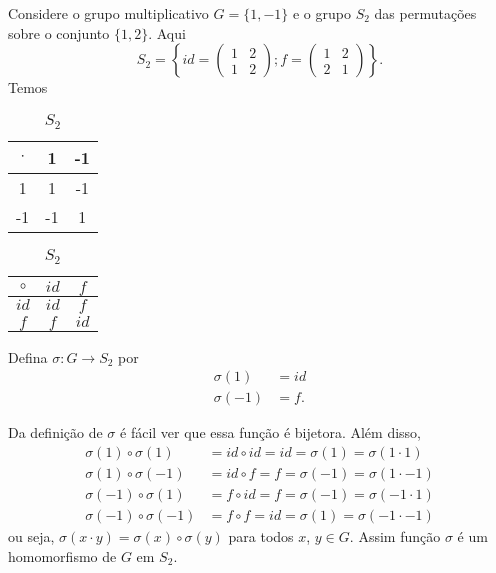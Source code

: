 Considere o grupo multiplicativo $G = \{1, -1\}$ e o grupo $S_2$ das permuta\c{c}\~oes sobre o conjunto $\{1,2\}$. Aqui
\[
    S_2 = \left\{id = \begin{pmatrix}
        1 & 2\\1 & 2
    \end{pmatrix}; f = \begin{pmatrix}
        1 & 2\\2 & 1
    \end{pmatrix}\right\}.
\]
Temos
\begin{table}[!htp]
    \begin{minipage}{.5\linewidth}
        \caption{$G$}
        \centering
        \begin{tabular}{|c|c|c|}
            \hline
            $\cdot$ & 1 & -1\\
            \hline
            1 & 1 & -1\\
            \hline
            -1 & -1 & 1\\
            \hline
        \end{tabular}
    \end{minipage}%
    \begin{minipage}{.5\linewidth}
        \caption{$S_2$}
        \centering
        \begin{tabular}{|c|c|c|}
            \hline
            $\circ$ & $id$ & $f$\\
            \hline
            $id$ & $id$ & $f$\\
            \hline
            $f$ & $f$ & $id$\\
            \hline
        \end{tabular}
    \end{minipage}
\end{table}

Defina $\sigma : G \to S_2$ por
\begin{align*}
    \sigma(1) &= id\\
    \sigma(-1) &= f.
\end{align*}

Da defini\c{c}\~ao de $\sigma$ \'e f\'acil ver que essa fun\c{c}\~ao \'e bijetora. Al\'em disso,
\begin{align*}
    \sigma(1) \circ \sigma(1) &= id \circ id = id = \sigma(1) = \sigma(1 \cdot 1)\\
    \sigma(1) \circ \sigma(-1) &= id \circ f = f = \sigma(-1) = \sigma(1 \cdot -1)\\
    \sigma(-1) \circ \sigma(1) &= f \circ id = f = \sigma(-1) = \sigma(-1 \cdot 1)\\
    \sigma(-1) \circ \sigma(-1) &= f \circ f = id = \sigma(1) = \sigma(-1 \cdot -1)
\end{align*}
ou seja, $\sigma(x\cdot y) = \sigma(x) \circ \sigma(y)$ para todos $x$, $y \in G$. Assim fun\c{c}\~ao $\sigma$ \'e um homomorfismo de $G$ em $S_2$.

